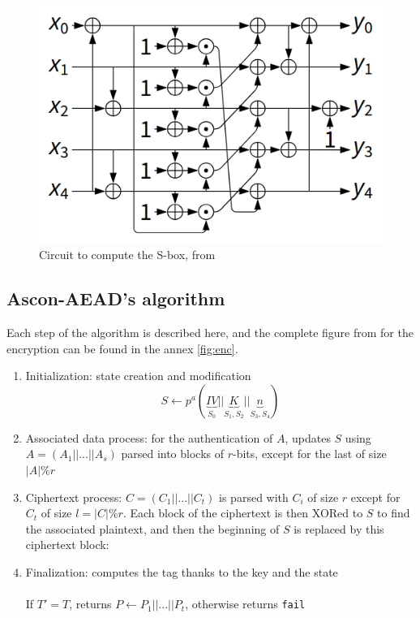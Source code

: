 \documentclass[11pt,technote]{IEEEtran}
\begin{document}
	\begin{figure}[H]
		\centering
		\includegraphics[scale=0.4]{img_files/circuit}
		\caption{Circuit to compute the S-box, from \cite{norme}}
		\label{circuit_sbox}
	\end{figure}
	
	
	\subsection{Ascon-AEAD's algorithm}
	Each step of the algorithm is described here, and the complete figure from \cite{cours_crypto} for the encryption can be found in the annex \ref{fig:enc}.
	
	\begin{enumerate}
		\item Initialization: state creation and modification
		$$S \leftarrow p^{a}( \underbrace{IV}_{S_0}||\underbrace{K}_{S_1,S_2}||\underbrace{n}_{S_3,S_4})$$
		
		\item Associated data process: for the authentication of $A$, updates $S$ using $A=(A_1||...||A_s)$ parsed into blocks of $r$-bits, except for the last of size $|A|\%r$\\
		
		\item Ciphertext process: $C = (C_1 || ... || C_t)$ is parsed with $C_i$ of size $r$ except for $C_t$ of size $l=|C| \% r$. Each block of the ciphertext is then XORed to $S$ to find the associated plaintext, and then the beginning of $S$ is replaced by this ciphertext block:\\
		
		\item Finalization: computes the tag thanks to the key and the state\\
		\\
		If $T'= T$, returns $P \leftarrow P_1 || ... || P_t$, otherwise returns \verb|fail|
	\end{enumerate}
	
\end{document}
